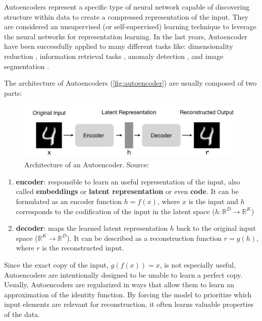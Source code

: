 Autoencoders represent a specific type of neural network capable of discovering structure within data to create a compressed representation of the input. They are considered an unsupervised (or self-supervised) learning technique to leverage the neural networks for representation learning. In the last years, Autoencoder have been successfully applied to many different tasks like: dimensionality reduction \citep{petscharnig2017dimensionality, wang2015dimensionality}, information retrieval tasks \citep{pfeiffer2018neural}, anomaly detection \citep{sakurada2014anomaly}, and image segmentation \citep{baur2018deep, karimpouli2019segmentation}.

The architecture of Autoencoders (\autoref{fig:autoencoder}) are usually composed of two parts:

\begin{figure}[h]
\centering
\includegraphics[width=\linewidth]{images/autoencoder.png}
\caption{Architecture of an Autoencoder. Source: \citep{autoencoder_architecture}}
\label{fig:autoencoder}
\end{figure}

\begin{enumerate}
\item \textbf{encoder}: responsible to learn an useful representation of the input, also called \textbf{embeddings} or \textbf{latent representation} or even \textbf{code}. It can be formulated as an encoder function $h = f(x)$, where $x$ is the input and $h$ corresponds to the codification of the input in the latent space ($h: \mathbb{R}^D \rightarrow \mathbb{R}^K$)

\item \textbf{decoder}: maps the learned latent representation $h$ back to the original input space ($\mathbb{R}^K \rightarrow \mathbb{R}^D$). It can be described as a reconstruction function $r = g(h)$, where $r$ is the reconstructed input.
\end{enumerate}

Since the exact copy of the input, $g(f(x)) = x$, is not especially useful, Autoencoders are intentionally designed to be unable to learn a perfect copy. Usually, Autoencoders are regularized in ways that allow them to learn an approximation of the identity function. By forcing the model to prioritize which input elements are relevant for reconstruction,  it often learns valuable properties of the data.

